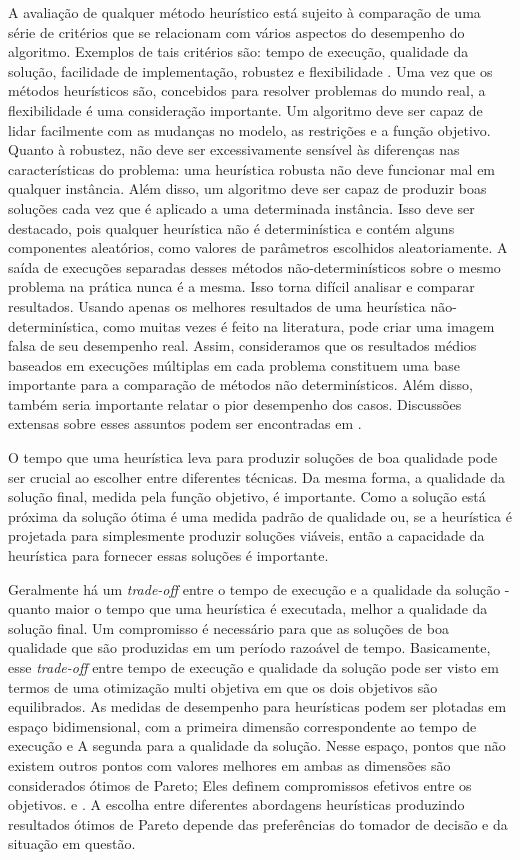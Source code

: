 A avaliação de qualquer método heurístico está sujeito à comparação de uma série de critérios que se relacionam com vários aspectos do desempenho do algoritmo. Exemplos de tais critérios são: tempo de execução, qualidade da solução, facilidade de implementação, robustez e flexibilidade \cite{cordeau12}. Uma vez que os métodos heurísticos são, concebidos para resolver problemas do mundo real, a flexibilidade é uma consideração importante. Um algoritmo deve ser capaz de lidar facilmente com as mudanças no modelo, as restrições e a função objetivo. Quanto à robustez, não deve ser excessivamente sensível às diferenças nas características do problema: uma heurística robusta não deve funcionar mal em qualquer instância. Além disso, um algoritmo deve ser capaz de produzir boas soluções cada vez que é aplicado a uma determinada instância. Isso deve ser destacado, pois qualquer heurística não é determinística e contém alguns componentes aleatórios, como valores de parâmetros escolhidos aleatoriamente. A saída de execuções separadas desses métodos não-determinísticos sobre o mesmo problema na prática nunca é a mesma. Isso torna difícil analisar e comparar resultados. Usando apenas os melhores resultados de uma heurística não-determinística, como muitas vezes é feito na literatura, pode criar uma imagem falsa de seu desempenho real. Assim, consideramos que os resultados médios baseados em execuções múltiplas em cada problema constituem uma base importante para a comparação de métodos não determinísticos. Além disso, também seria importante relatar o pior desempenho dos casos. Discussões extensas sobre esses assuntos podem ser encontradas em \cite{cordeau12}.



O tempo que uma heurística leva para produzir soluções de boa qualidade pode ser crucial ao escolher entre diferentes técnicas. Da mesma forma, a qualidade da solução final, medida pela função objetivo, é importante. Como a solução está próxima da solução ótima é uma medida padrão de qualidade ou, se a heurística é projetada para simplesmente produzir soluções viáveis, então a capacidade da heurística para fornecer essas soluções é importante.


Geralmente há um \textit{trade-off} entre o tempo de execução e a qualidade da solução - quanto maior o tempo que uma heurística é executada, melhor a qualidade da solução final. Um compromisso é necessário para que as soluções de boa qualidade que são produzidas em um período razoável de tempo. Basicamente, esse \textit{trade-off} entre tempo de execução e qualidade da solução pode ser visto em termos de uma otimização multi objetiva em que os dois objetivos são equilibrados. As medidas de desempenho para heurísticas podem ser plotadas em espaço bidimensional, com a primeira dimensão correspondente ao tempo de execução e A segunda para a qualidade da solução. Nesse espaço, pontos que não existem outros pontos com valores melhores em ambas as dimensões são considerados ótimos de Pareto; Eles definem compromissos efetivos entre os objetivos. \cite{russell94} e \cite{braysy05} . A escolha entre diferentes abordagens heurísticas produzindo resultados ótimos de Pareto depende das preferências do tomador de decisão e da situação em questão.


